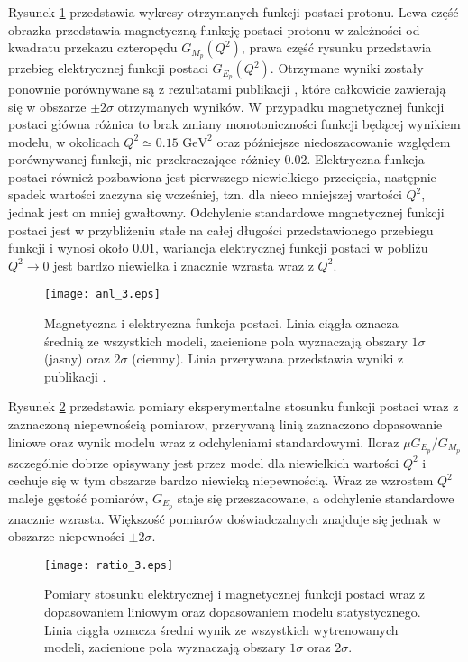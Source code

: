 \documentclass[11pt]{book}
\theoremstyle{definition}
\begin{document}
Rysunek \ref{fig:ff3} przedstawia wykresy otrzymanych funkcji postaci protonu. Lewa część obrazka przedstawia magnetyczną funkcję postaci protonu w zależności od kwadratu przekazu czteropędu $G_{M_p}\left(Q^2\right)$, prawa część rysunku przedstawia przebieg elektrycznej funkcji postaci $G_{E_p}\left(Q^2\right)$. Otrzymane wyniki zostały ponownie porównywane są z rezultatami publikacji \cite{2009PhRvC..79f5204A}, które całkowicie zawierają się w obszarze $\pm 2\sigma$ otrzymanych wyników. W przypadku magnetycznej funkcji postaci główna różnica to brak zmiany monotoniczności funkcji będącej wynikiem modelu, w okolicach $Q^2 \simeq 0.15 \text{ GeV}^2$ oraz późniejsze niedoszacowanie względem porównywanej funkcji, nie przekraczające różnicy 0.02. Elektryczna funkcja postaci również pozbawiona jest pierwszego niewielkiego przecięcia, następnie spadek wartości zaczyna się wcześniej, tzn. dla nieco mniejszej wartości $Q^2$, jednak jest on mniej gwałtowny. Odchylenie standardowe magnetycznej funkcji postaci jest w przybliżeniu stałe na całej długości przedstawionego przebiegu funkcji i wynosi około $0.01$, wariancja elektrycznej funkcji postaci w pobliżu $Q^2 \rightarrow 0$ jest bardzo niewielka i znacznie wzrasta wraz z $Q^2$.
% 
\begin{figure}[h]
	\centering
	\texttt{[image: anl\_3.eps]}
	\caption{Magnetyczna i elektryczna funkcja postaci. Linia ciągła oznacza średnią ze wszystkich modeli, zacienione pola wyznaczają obszary $1 \sigma$ (jasny) oraz $2\sigma$ (ciemny). Linia przerywana przedstawia wyniki z publikacji \cite{2009PhRvC..79f5204A}. } 
	\label{fig:ff3}
\end{figure}

Rysunek \ref{fig:ratio3} przedstawia pomiary eksperymentalne stosunku funkcji postaci wraz z zaznaczoną niepewnością pomiarow, przerywaną linią zaznaczono dopasowanie liniowe oraz wynik modelu wraz z odchyleniami standardowymi. Iloraz $\mu G_{E_p} / G_{M_p}$ szczególnie dobrze opisywany jest przez model dla niewielkich wartości $Q^2$ i cechuje się w tym obszarze bardzo niewieką niepewnością. Wraz ze wzrostem $Q^2$ maleje gęstość pomiarów, $G_{E_p}$ staje się przeszacowane, a odchylenie standardowe znacznie wzrasta. Większość pomiarów doświadczalnych znajduje się jednak w obszarze niepewności $\pm2\sigma$.
%
\begin{figure}[h!]
	\centering
	\texttt{[image: ratio\_3.eps]}
	\caption{Pomiary stosunku elektrycznej i magnetycznej funkcji postaci wraz z dopasowaniem liniowym oraz dopasowaniem modelu statystycznego. Linia ciągła oznacza średni wynik ze wszystkich wytrenowanych modeli, zacienione pola wyznaczają obszary $1 \sigma$ oraz $2\sigma$.} 
	\label{fig:ratio3}
\end{figure}
%
\end{document}
